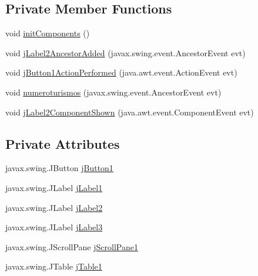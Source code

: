 \subsection*{Private Member Functions}
\begin{DoxyCompactItemize}
\item 
void \mbox{\hyperlink{classejercicio2_1_1_interfaz_estadisticas_a1d07ba3d06b59fe5255f3ae1f5d44641}{init\+Components}} ()
\item 
void \mbox{\hyperlink{classejercicio2_1_1_interfaz_estadisticas_a1a93ffcd06a1b4c1e6fd686adff3d694}{j\+Label2\+Ancestor\+Added}} (javax.\+swing.\+event.\+Ancestor\+Event evt)
\item 
void \mbox{\hyperlink{classejercicio2_1_1_interfaz_estadisticas_aa3d00a7600a56a65dcde3ab694c902db}{j\+Button1\+Action\+Performed}} (java.\+awt.\+event.\+Action\+Event evt)
\item 
void \mbox{\hyperlink{classejercicio2_1_1_interfaz_estadisticas_a7cea5027e3bb66ab639fb412c07dd74d}{numeroturismos}} (javax.\+swing.\+event.\+Ancestor\+Event evt)
\item 
void \mbox{\hyperlink{classejercicio2_1_1_interfaz_estadisticas_a5108f18639c11d9e4c3e1b5db4a19f17}{j\+Label2\+Component\+Shown}} (java.\+awt.\+event.\+Component\+Event evt)
\end{DoxyCompactItemize}
\subsection*{Private Attributes}
\begin{DoxyCompactItemize}
\item 
javax.\+swing.\+J\+Button \mbox{\hyperlink{classejercicio2_1_1_interfaz_estadisticas_a2e04a5a0eb4f298d827c33c859436a97}{j\+Button1}}
\item 
javax.\+swing.\+J\+Label \mbox{\hyperlink{classejercicio2_1_1_interfaz_estadisticas_a5e051aa4c804a5eb48e3f047abce704c}{j\+Label1}}
\item 
javax.\+swing.\+J\+Label \mbox{\hyperlink{classejercicio2_1_1_interfaz_estadisticas_a227479001256e104ad41996508f6125e}{j\+Label2}}
\item 
javax.\+swing.\+J\+Label \mbox{\hyperlink{classejercicio2_1_1_interfaz_estadisticas_a7cdf095cdfd4621585f0a166faab002e}{j\+Label3}}
\item 
javax.\+swing.\+J\+Scroll\+Pane \mbox{\hyperlink{classejercicio2_1_1_interfaz_estadisticas_a71c5280640fc8af4bc76d5e28c4ef3ba}{j\+Scroll\+Pane1}}
\item 
javax.\+swing.\+J\+Table \mbox{\hyperlink{classejercicio2_1_1_interfaz_estadisticas_a8e1c593e42b594f030777722609358a1}{j\+Table1}}
\end{DoxyCompactItemize}


